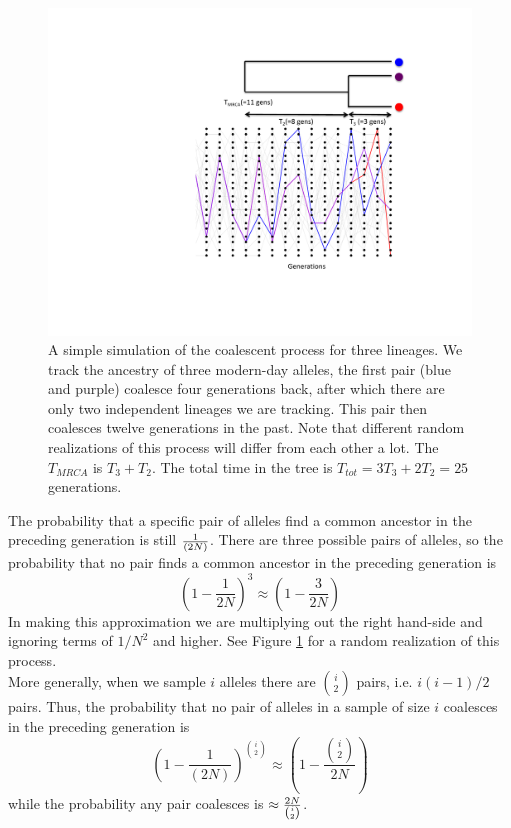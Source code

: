 \begin{figure}
\begin{center}
  \includegraphics[width = 0.75 \textwidth]{figures/Coalescent/Coal_three_lineages.pdf}
\end{center}
\caption{A simple simulation of the coalescent process for three
  lineages. We track the ancestry of
  three modern-day alleles, the first pair (blue and purple) coalesce four generations back, after which
  there are only two independent lineages we are tracking. This pair
  then coalesces twelve generations in the past. Note that different
  random realizations of this process will differ from each other a lot. The $T_{MRCA}$ is $T_3+T_2$. The total time in the tree is $T_{tot}=3T_3 + 2T_2= 25$ generations.  } \label{fig:Coalescent_simulation_3}
\end{figure}

The probability that a specific pair of alleles find a common ancestor in the
preceding generation is still $\nicefrac{1}{(2N)}$. There are three possible pairs of
alleles, so the probability that no pair finds a common ancestor in the preceding generation is
\begin{equation}
\left(1-\frac{1}{2N} \right)^3 \approx \left( 1- \frac{3}{2N} \right)
\end{equation}
In making this approximation we are multiplying out the right hand-side
and ignoring terms of $1/N^2$ and higher.
 See Figure \ref{fig:Coalescent_simulation_3} for a random realization of this process. \\

More generally, when we sample $i$ alleles there are ${i \choose 2}$
pairs,  i.e. $i(i-1)/2$ pairs.
Thus, the probability that no pair of alleles in a sample of size $i$ coalesces in the preceding generation is
\begin{equation}
\left(1-\frac{1}{(2N)} \right)^{{i \choose
 2}} \approx \left( 1- \frac{{i \choose
 2}}{2N}\right)
\end{equation}
while the probability any pair coalesces is $\approx \nicefrac{2N}{{i \choose
 2}}$.\\

